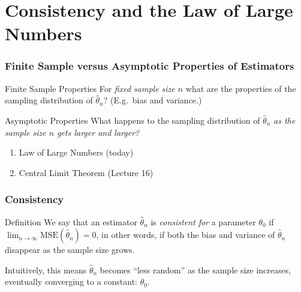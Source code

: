 \section{Consistency and the Law of Large Numbers}
\begin{frame}
\frametitle{Finite Sample versus Asymptotic Properties of Estimators}

\begin{block}{Finite Sample Properties}
For \emph{fixed sample size $n$} what are the properties of the sampling distribution of $\widehat{\theta}_n$? (E.g.\ bias and variance.)
\end{block}

\begin{block}{Asymptotic Properties}
What happens to the sampling distribution of $\widehat{\theta}_n$ \alert{\emph{as the sample size $n$ gets larger and larger?}} 
  \begin{enumerate}
    \item Law of Large Numbers (today)
    \item Central Limit Theorem (Lecture 16)
  \end{enumerate}
\end{block}

\end{frame}
\begin{frame}
\frametitle{Consistency}

\begin{block}{Definition}
  We say that an estimator $\widehat{\theta}_n$ is \emph{consistent for} a parameter $\theta_0$ if $\lim_{n\rightarrow \infty} \text{MSE}(\widehat{\theta}_n) = 0$, 
  in other words, if both the bias and variance of $\widehat{\theta}_n$ disappear as the sample size grows.
\end{block}

\vspace{2em}

\alert{Intuitively, this means $\widehat{\theta}_n$ becomes ``less random'' as the sample size increases, eventually converging to a constant: $\theta_0$.}

\end{frame}

